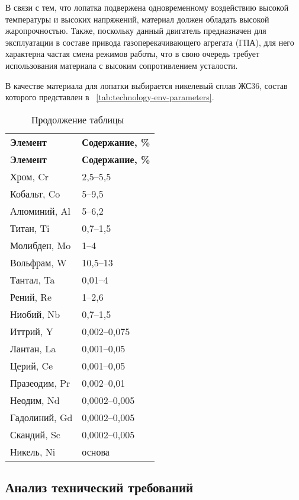 В связи с тем, что лопатка подвержена одновременному воздействию высокой температуры и высоких напряжений, материал должен обладать высокой жаропрочностью. Также, поскольку данный двигатель предназначен для эксплуатации в составе привода газоперекачивающего агрегата (ГПА), для него характерна частая смена режимов работы, что в свою очередь требует использования материала с высоким сопротивлением усталости.

В качестве материала для лопатки выбирается никелевый сплав ЖС36, состав которого представлен в ~\ref{tab:technology-env-parameters}.

\begin{longtable}{|l|l|}
	\caption{Состав сплава ЖС36} \label{tab:technology-alloy-properties}
	\endfirsthead
	\caption*{\tabcapalign Продолжение таблицы~\thetable}\\[-0.45\onelineskip]
	\hline
	\textbf{Элемент} & \textbf{Содержание, \%} \\ \hline
	\endhead
	\hline
	\textbf{Элемент} & \textbf{Содержание, \%} \\ \hline
	Хром, Cr & 2,5–5,5 \\ \hline
	Кобальт, Co & 5–9,5 \\ \hline
	Алюминий, Al & 5–6,2 \\ \hline
	Титан, Ti & 0,7–1,5 \\ \hline
	Молибден, Mo & 1–4 \\ \hline
	Вольфрам, W & 10,5–13 \\ \hline
	Тантал, Ta & 0,01–4 \\ \hline
	Рений, Re & 1–2,6 \\ \hline
	Ниобий, Nb & 0,7–1,5 \\ \hline
	Иттрий, Y & 0,002–0,075 \\ \hline
	Лантан, La & 0,001–0,05 \\ \hline
	Церий, Ce & 0,001–0,05 \\ \hline
	Празеодим, Pr & 0,002–0,01 \\ \hline
	Неодим, Nd & 0,0002–0,005 \\ \hline
	Гадолиний, Gd & 0,0002–0,005 \\ \hline
	Скандий, Sc & 0,0002–0,005 \\ \hline
	Никель, Ni & основа \\ \hline
\end{longtable}

\subsection{Анализ технический требований}

